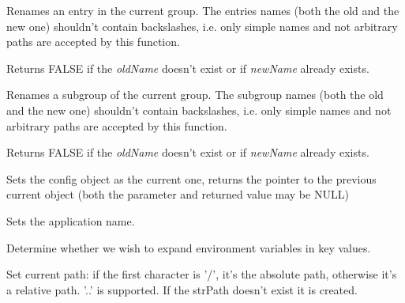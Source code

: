 Renames an entry in the current group. The entries names (both the old and
the new one) shouldn't contain backslashes, i.e. only simple names and not
arbitrary paths are accepted by this function.

Returns FALSE if the {\it oldName} doesn't exist or if {\it newName} already
exists.

\label{wxconfigbaserenamegroup}


Renames a subgroup of the current group. The subgroup names (both the old and
the new one) shouldn't contain backslashes, i.e. only simple names and not
arbitrary paths are accepted by this function.

Returns FALSE if the {\it oldName} doesn't exist or if {\it newName} already
exists.

\label{wxconfigbaseset}


Sets the config object as the current one, returns the pointer to the previous
current object (both the parameter and returned value may be NULL)

\label{wxconfigbasesetappname}


Sets the application name.

\label{wxconfigbasesetexpandingenvvars}


Determine whether we wish to expand environment variables in key values.

\label{wxconfigbasesetpath}


Set current path: if the first character is '/', it's the absolute path,
otherwise it's a relative path. '..' is supported. If the strPath doesn't
exist it is created.

\label{wxconfigbasesetrecorddefaults}


